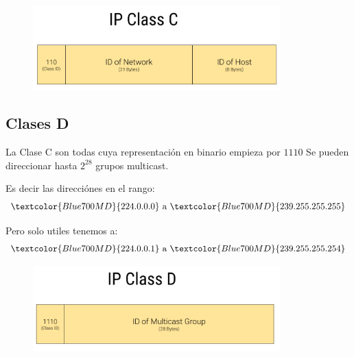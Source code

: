 \documentclass[12pt, fleqn]{report}                             %
\theoremstyle{break}                                            %
\newcommand{\Color}[2]{\textcolor{#1}{#2}}                      %
\begin{document}
                \begin{figure}[h]
                    \centering
                    \includegraphics[width=0.85\textwidth]{ClassC}
                \end{figure}


            \clearpage
            \subsection{Clases D}

                La Clase C son todas cuya representación en binario empieza por $1110$
                Se pueden direccionar hasta $2^{28}$ grupos multicast.

                Es decir las direcciónes en el rango:
                \begin{equation*}
                    \Color{Blue700MD}{224.0.0.0}
                    \text{ a }
                    \Color{Blue700MD}{239.255.255.255}
                \end{equation*}

                Pero solo utiles tenemos a:
                \begin{equation*}
                    \Color{Blue700MD}{224.0.0.1}
                    \text{ a }
                    \Color{Blue700MD}{239.255.255.254}
                \end{equation*}

                \begin{figure}[h]
                    \centering
                    \includegraphics[width=0.85\textwidth]{ClassD}
                \end{figure}
\end{document}

